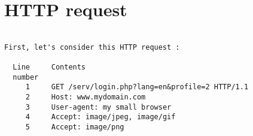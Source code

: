 
\section{HTTP request}

\begin{verbatim}

First, let's consider this HTTP request :

  Line     Contents
  number
     1     GET /serv/login.php?lang=en&profile=2 HTTP/1.1
     2     Host: www.mydomain.com
     3     User-agent: my small browser
     4     Accept: image/jpeg, image/gif
     5     Accept: image/png


\end{verbatim}
